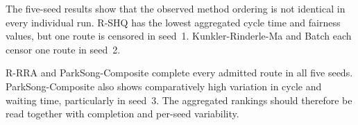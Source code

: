 \begin{table}[H]
    \caption{Canonical fixed-replay allocation results over five seeds.
    Cycle time is reported for completed fixed routes. Values are
    mean $\pm$ sample standard deviation where shown.}
    \label{tab:joao_fixed_replay}
    \centering
    \renewcommand{\arraystretch}{1.12}
    \scriptsize
\end{table}

The five-seed results show that the observed method ordering is not identical
in every individual run. R-SHQ has the lowest aggregated cycle time and
fairness values, but one route is censored in seed~1. Kunkler-Rinderle-Ma and
Batch each censor one route in seed~2.

R-RRA and ParkSong-Composite complete every admitted route in all five seeds.
ParkSong-Composite also shows comparatively high variation in cycle and waiting
time, particularly in seed~3. The aggregated rankings should therefore be read
together with completion and per-seed variability.


